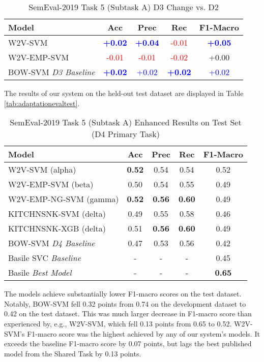 \documentclass[11pt,a4paper]{article}
\begin{document}
\begin{table}[hbt!]
\centering
\caption{SemEval-2019 Task 5 (Subtask A) D3 Change vs. D2}
\label{tab:resultschange}
\scriptsize
\begin{tabular}{lcccc}
\hline
Model & Acc & Prec & Rec & F1-Macro \\ \hline
\textsc{W2V-SVM} & \textcolor{blue}{\textbf{+0.02}} & \textcolor{blue}{\textbf{+0.04}} & \textcolor{red}{-0.01} & \textcolor{blue}{\textbf{+0.05}} \\
\textsc{W2V-EMP-SVM} & \textcolor{red}{-0.01} & \textcolor{red}{-0.01} & \textcolor{red}{-0.02} & +0.00 \\
\textsc{BOW-SVM} \textit{D3 Baseline} & \textcolor{blue}{\textbf{+0.02}} & \textcolor{blue}{+0.02} & \textcolor{blue}{\textbf{+0.02}} & \textcolor{blue}{+0.02} \\
\hline
\end{tabular}
\end{table}

The results of our system on the held-out test dataset are displayed in Table \ref{tab:adaptationevaltest}. 

\begin{table}[hbt!]
\centering
\caption{SemEval-2019 Task 5 (Subtask A) Enhanced Results on Test Set (D4 Primary Task)}
\label{tab:enhancedresults}
\scriptsize
\begin{tabular}{lcccc}
\hline
Model & Acc & Prec & Rec & F1-Macro \\ \hline
\textsc{W2V-SVM} (alpha) & \textbf{0.52} & 0.54 & 0.54 & 0.52 \\
\textsc{W2V-EMP-SVM} (beta) & 0.50 & 0.54 & 0.55 & 0.49 \\
\textsc{W2V-EMP-NG-SVM} (gamma) & \textbf{0.52} & \textbf{0.56} & \textbf{0.60} & 0.49 \\
\textsc{KITCHNSNK-SVM} (delta) & 0.49 & 0.55 & 0.58 & 0.46 \\
\textsc{KITCHNSNK-XGB} (delta) & 0.51 & \textbf{0.56} & \textbf{0.60} & 0.49 \\
\textsc{BOW-SVM} \textit{D4 Baseline} & 0.47 & 0.53 & 0.56 & 0.42 \\
Basile SVC \textit{Baseline} & - & - & - & 0.45 \\
Basile \textit{Best Model} & - & - & - & \textbf{0.65} \\ \hline
\end{tabular}
\end{table}

The models achieve substantially lower F1-macro scores on the test dataset. Notably, BOW-SVM fell 0.32 points from 0.74 on the development dataset to 0.42 on the test dataset. This was much larger decrease in F1-macro score than experienced by, e.g., W2V-SVM, which fell 0.13 points from 0.65 to 0.52. W2V-SVM’s F1-macro score was the highest achieved by any of our system’s models. It exceeds the \citet{basile-etal-2019-semeval} baseline F1-macro score by 0.07 points, but lags the best published model from the Shared Task by 0.13 points.
\end{document}
